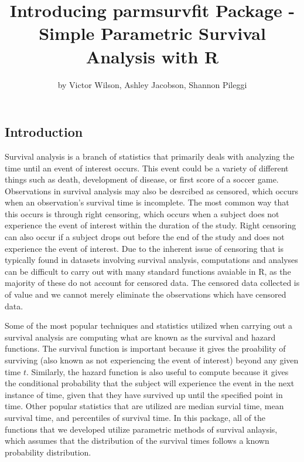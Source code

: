 \title{Introducing parmsurvfit Package - Simple Parametric Survival Analysis
with R}
\author{by Victor Wilson, Ashley Jacobson, Shannon Pileggi}

\maketitle



\hypertarget{introduction}{%
\subsection{Introduction}\label{introduction}}

Survival analysis is a branch of statistics that primarily deals with
analyzing the time until an event of interest occurs. This event could
be a variety of different things such as death, development of disease,
or first score of a soccer game. Observations in survival analysis may
also be desrcibed as censored, which occurs when an observation's
survival time is incomplete. The most common way that this occurs is
through right censoring, which occurs when a subject does not experience
the event of interest within the duration of the study. Right censoring
can also occur if a subject drops out before the end of the study and
does not experience the event of interest. Due to the inherent issue of
censoring that is typically found in datasets involving survival
analysis, computations and analyses can be difficult to carry out with
many standard functions avaiable in R, as the majority of these do not
account for censored data. The censored data collected is of value and
we cannot merely eliminate the observations which have censored data.

Some of the most popular techniques and statistics utilized when
carrying out a survival analysis are computing what are known as the
survival and hazard functions. The survival function is important
because it gives the proability of surviving (also known as not
experiencing the event of interest) beyond any given time \(t\).
Similarly, the hazard function is also useful to compute because it
gives the conditional probability that the subject will experience the
event in the next instance of time, given that they have survived up
until the specified point in time. Other popular statistics that are
utilized are median survial time, mean survival time, and percentiles of
survival time. In this package, all of the functions that we developed
utilize parametric methods of survival anlaysis, which assumes that the
distribution of the survival times follows a known probability
distribution.

